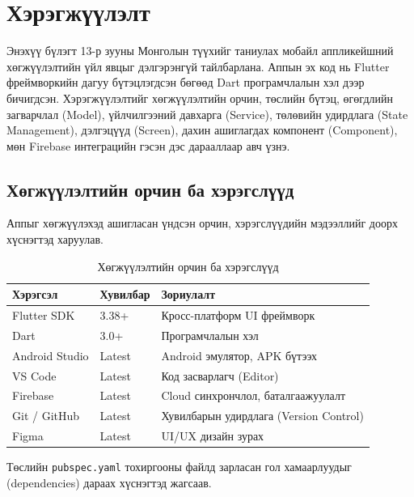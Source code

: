 \newpage
\pagestyle{plain}
\chapter{Хэрэгжүүлэлт}

Энэхүү бүлэгт 13-р зууны Монголын түүхийг таниулах мобайл аппликейшний хөгжүүлэлтийн үйл явцыг дэлгэрэнгүй тайлбарлана. Аппын эх код нь Flutter фреймворкийн дагуу бүтэцлэгдсэн бөгөөд Dart програмчлалын хэл дээр бичигдсэн. Хэрэгжүүлэлтийг хөгжүүлэлтийн орчин, төслийн бүтэц, өгөгдлийн загварчлал (Model), үйлчилгээний давхарга (Service), төлөвийн удирдлага (State Management), дэлгэцүүд (Screen), дахин ашиглагдах компонент (Component), мөн Firebase интеграцийн гэсэн дэс дарааллаар авч үзнэ.

\section{Хөгжүүлэлтийн орчин ба хэрэгслүүд}

Аппыг хөгжүүлэхэд ашигласан үндсэн орчин, хэрэгслүүдийн мэдээллийг доорх хүснэгтэд харуулав.

\begin{table}[htbp]
\centering
\begin{tabular}{|p{3.5cm}|p{3.5cm}|p{6.5cm}|}
\hline
\textbf{Хэрэгсэл} & \textbf{Хувилбар} & \textbf{Зориулалт} \\
\hline
Flutter SDK & 3.38+ & Кросс-платформ UI фреймворк \\
\hline
Dart & 3.0+ & Програмчлалын хэл \\
\hline
Android Studio & Latest & Android эмулятор, APK бүтээх \\
\hline
VS Code & Latest & Код засварлагч (Editor) \\
\hline
Firebase & Latest & Cloud синхрончлол, баталгаажуулалт \\
\hline
Git / GitHub & Latest & Хувилбарын удирдлага (Version Control) \\
\hline
Figma & Latest & UI/UX дизайн зурах \\
\hline
\end{tabular}
\caption{Хөгжүүлэлтийн орчин ба хэрэгслүүд}
\label{tab:dev_tools}
\end{table}

Төслийн \texttt{pubspec.yaml} тохиргооны файлд зарласан гол хамаарлуудыг (dependencies) дараах хүснэгтэд жагсаав.

